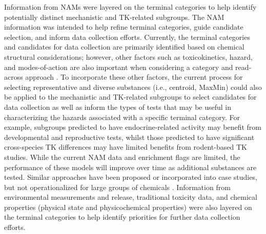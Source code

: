 \documentclass[
  super,
  preprint,
  3p]{elsarticle}
\begin{document}
Information from NAMs were layered on the terminal categories to help
identify potentially distinct mechanistic and TK-related subgroups. The
NAM information was intended to help refine terminal categories, guide
candidate selection, and inform data collection efforts. Currently, the
terminal categories and candidates for data collection are primarily
identified based on chemical structural considerations; however, other
factors such as toxicokinetics, hazard, and modes-of-action are also
important when considering a category and read-across approach
\citep{patlewicz_towards_2023}. To incorporate these other factors, the
current process for selecting representative and diverse substances
(i.e., centroid, MaxMin) could also be applied to the mechanistic and
TK-related subgroups to select candidates for data collection as well as
inform the types of tests that may be useful in characterizing the
hazards associated with a specific terminal category. For example,
subgroups predicted to have endocrine-related activity may benefit from
developmental and reproductive tests, whilst those predicted to have
significant cross-species TK differences may have limited benefits from
rodent-based TK studies. While the current NAM data and enrichment flags
are limited, the performance of these models will improve over time as
additional substances are tested. Similar approaches have been proposed
or incorporated into case studies, but not operationalized for large
groups of chemicals
\citep{escher_towards_2019, webster_2019, oecd_iata_2018}. Information
from environmental measurements and release, traditional toxicity data,
and chemical properties (physical state and physicochemical properties)
were also layered on the terminal categories to help identify priorities
for further data collection efforts.
\end{document}
